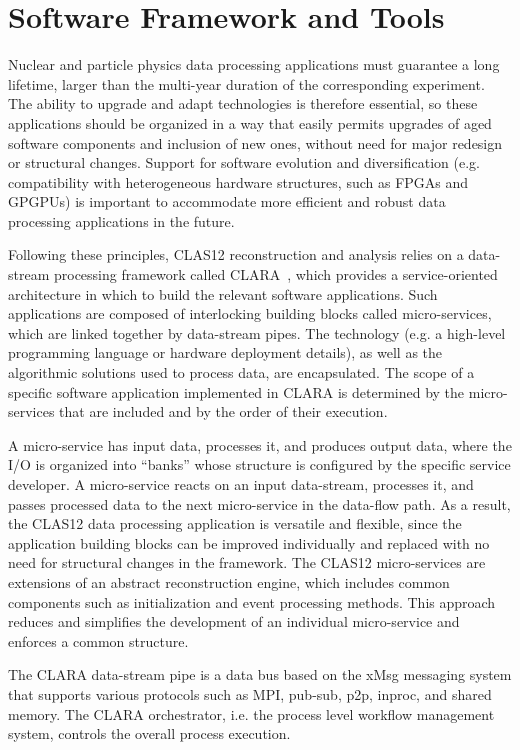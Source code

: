 \section{Software Framework and Tools}
\label{sec:framework}

Nuclear and particle physics data processing applications must guarantee a long lifetime, larger than the multi-year
duration of the corresponding experiment. The ability to upgrade and adapt technologies is therefore essential, so
these applications should be organized in a way that easily permits upgrades of aged software components and
inclusion of new ones, without need for major redesign or structural changes.  Support for software evolution and
diversification (e.g. compatibility with heterogeneous hardware structures, such as FPGAs and GPGPUs) is important
to accommodate more efficient and robust data processing applications in the future.

Following these principles, CLAS12 reconstruction and analysis relies on a data-stream processing framework called
CLARA~\cite{clara-2011,clara-service,framework,clara-2016}, which provides a service-oriented architecture in which
to build the relevant software applications.  Such applications are composed of interlocking building blocks called
micro-services, which are linked together by data-stream pipes.  The technology (e.g. a high-level programming
language or hardware deployment details), as well as the algorithmic solutions used to process data, are encapsulated.
The scope of a specific software application implemented in CLARA is determined by the micro-services that are
included and by the order of their execution.

A micro-service has input data, processes it, and produces output data, where the I/O is organized into ``banks''
whose structure is configured by the specific service developer.  A micro-service reacts on an input data-stream,
processes it, and passes processed data to the next micro-service in the data-flow path.  As a result, the CLAS12
data processing application is versatile and flexible, since the application building blocks can be improved individually
and replaced with no need for structural changes in the framework. The CLAS12 micro-services are extensions of an
abstract reconstruction engine, which includes common components such as initialization and event processing
methods. This approach reduces and simplifies the development of an individual micro-service and enforces a common
structure. 

The CLARA data-stream pipe is a data bus based on the xMsg messaging system that supports various protocols
such as MPI, pub-sub, p2p, inproc, and shared memory. The CLARA orchestrator, i.e. the process level workflow
management system, controls the overall process execution. 

